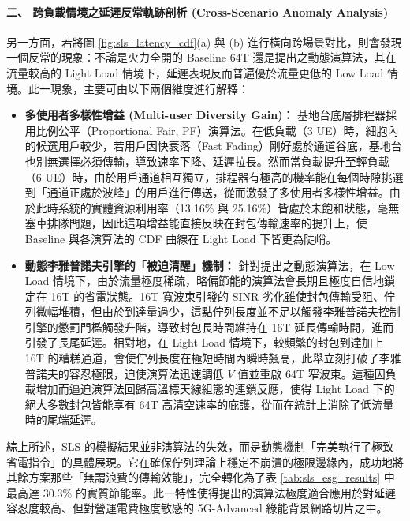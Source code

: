 \paragraph{二、 跨負載情境之延遲反常軌跡剖析 (Cross-Scenario Anomaly Analysis)}
另一方面，若將圖 \ref{fig:sls_latency_cdf}(a) 與 (b) 進行橫向跨場景對比，則會發現一個反常的現象：不論是火力全開的 Baseline 64T 還是提出之動態演算法，其在流量較高的 Light Load 情境下，延遲表現反而普遍優於流量更低的 Low Load 情境。此一現象，主要可由以下兩個維度進行解釋：
\begin{itemize}
    \item \textbf{多使用者多樣性增益 (Multi-user Diversity Gain)：} 
    基地台底層排程器採用比例公平（Proportional Fair, PF）演算法。在低負載（3 UE）時，細胞內的候選用戶較少，若用戶因快衰落（Fast Fading）剛好處於通道谷底，基地台也別無選擇必須傳輸，導致速率下降、延遲拉長。然而當負載提升至輕負載（6 UE）時，由於用戶通道相互獨立，排程器有極高的機率能在每個時隙挑選到「通道正處於波峰」的用戶進行傳送，從而激發了多使用者多樣性增益。由於此時系統的實體資源利用率（13.16\% 與 25.16\%）皆處於未飽和狀態，毫無塞車排隊問題，因此這項增益能直接反映在封包傳輸速率的提升上，使 Baseline 與各演算法的 CDF 曲線在 Light Load 下皆更為陡峭。
    
    \item \textbf{動態李雅普諾夫引擎的「被迫清醒」機制：} 
    針對提出之動態演算法，在 Low Load 情境下，由於流量極度稀疏，略偏節能的演算法會長期且極度自信地鎖定在 16T 的省電狀態。16T 寬波束引發的 SINR 劣化雖使封包傳輸受阻、佇列微幅堆積，但由於到達量過少，這點佇列長度並不足以觸發李雅普諾夫控制引擎的懲罰門檻觸發升階，導致封包長時間維持在 16T 延長傳輸時間，進而引發了長尾延遲。相對地，在 Light Load 情境下，較頻繁的封包到達加上 16T 的糟糕通道，會使佇列長度在極短時間內瞬時飆高，此舉立刻打破了李雅普諾夫的容忍極限，迫使演算法迅速調低 $V$ 值並重啟 64T 窄波束。這種因負載增加而逼迫演算法回歸高溫標天線組態的連鎖反應，使得 Light Load 下的絕大多數封包皆能享有 64T 高清空速率的庇護，從而在統計上消除了低流量時的尾端延遲。
\end{itemize}

綜上所述，SLS 的模擬結果並非演算法的失效，而是動態機制「完美執行了極致省電指令」的具體展現。它在確保佇列理論上穩定不崩潰的極限邊緣內，成功地將其餘方案那些「無謂浪費的傳輸效能」，完全轉化為了表 \ref{tab:sls_esg_results} 中最高達 30.3\% 的實質節能率。此一特性使得提出的演算法極度適合應用於對延遲容忍度較高、但對營運電費極度敏感的 5G-Advanced 綠能背景網路切片之中。


